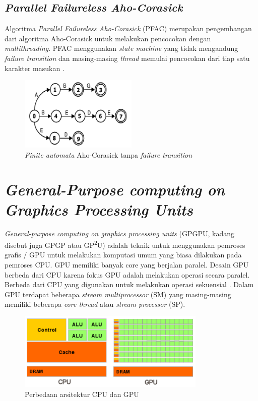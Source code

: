   \subsection {\emph{Parallel Failureless Aho-Corasick}}

    Algoritma \emph{Parallel Failureless Aho-Corasick} (PFAC) merupakan pengembangan dari algoritma Aho-Corasick untuk melakukan pencocokan dengan \emph{multithreading}. PFAC menggunakan \emph{state machine} yang tidak mengandung \emph{failure transition} dan masing-masing \emph{thread} memulai pencocokan dari tiap satu karakter masukan \citep{lin2013}.

    \begin{figure}[htb]
      \centering
      \includegraphics[width=0.5\textwidth]{resources/pfac.png}
      \caption[\emph{Finite automata} Aho-Corasick tanpa \emph{failure transition}]{\emph{Finite automata} Aho-Corasick tanpa \emph{failure transition} \citep{lin2013}}
    \end{figure}

\section{\emph{General-Purpose computing on Graphics Processing Units}}

  \emph{General-purpose computing on graphics processing units} (GPGPU, kadang disebut juga GPGP atau GP\textsuperscript{2}U) adalah teknik untuk menggunakan pemroses grafis / GPU untuk melakukan komputasi umum yang biasa dilakukan pada pemroses CPU. GPU memiliki banyak core yang berjalan paralel. Desain GPU berbeda dari CPU karena fokus GPU adalah melakukan operasi secara paralel. Berbeda dari CPU yang digunakan untuk melakukan operasi sekuensial \citep{lindholm2001}. Dalam GPU terdapat beberapa \emph{stream multiprocessor} (SM) yang masing-masing memiliki beberapa \emph{core thread} atau \emph{stream processor} (SP).

  \begin{figure}[htb]
    \centering
    \includegraphics[width=0.8\textwidth]{resources/GPUvsCPU.png}
    \caption[Perbedaan arsitektur CPU dan GPU]{Perbedaan arsitektur CPU dan GPU \citep{cuda}}
  \end{figure}

